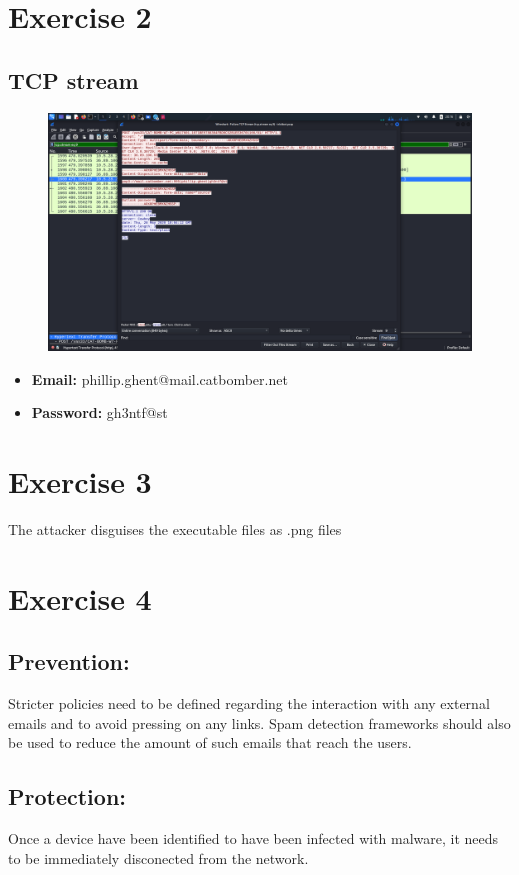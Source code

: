 \documentclass{article}
\numberwithin{equation}{subsection}
\begin{document}
	\newpage

	\section{Exercise 2}
	\subsection{TCP stream}
	\begin{figure}[H]
		\includegraphics[width=400pt]{pics/2.png}
	\end{figure}


	\begin{itemize}
		\item \textbf{Email:} phillip.ghent@mail.catbomber.net
		\item \textbf{Password:} gh3ntf@st
	\end{itemize}

	\newpage
	\section{Exercise 3}
	\par{
		The attacker disguises the executable files as .png files
	}	


	\vspace{30pt}
	\section{Exercise 4}

	\subsection{Prevention:}
	\par{
		Stricter policies need to be defined regarding the interaction with any 
		external emails and to avoid pressing on any links. Spam detection frameworks 
		should also be used to reduce the amount of such emails that reach the users.
	}

	\subsection{Protection:}
	\par{
		Once a device have been identified to have been infected with malware, it needs
		to be immediately disconected from the network.
	}
\end{document}
